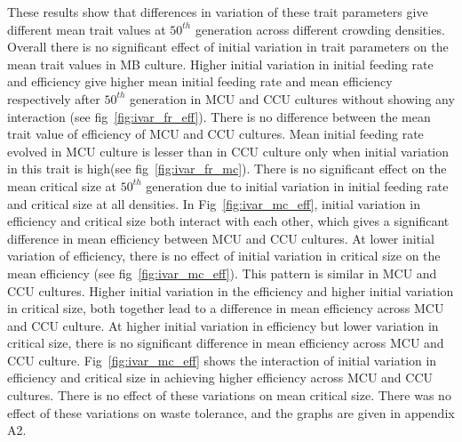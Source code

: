 These results show that differences in variation of these trait parameters give different mean trait values at $50^{th}$ generation across different crowding densities. Overall there is no significant effect of initial variation in trait parameters on the mean trait values in MB culture. Higher initial variation in initial feeding rate and efficiency give higher mean initial feeding rate and mean efficiency respectively after $50^{th}$ generation in MCU and CCU cultures without showing any interaction (see fig~\ref{fig:ivar_fr_eff}). There is no difference between the mean trait value of efficiency of MCU and CCU cultures. Mean initial feeding rate evolved in MCU culture is lesser than in CCU culture only when initial variation in this trait is high(see fig~\ref{fig:ivar_fr_mc}). There is no significant effect on the mean critical size at $50^{th}$ generation due to initial variation in initial feeding rate and critical size at all densities. In Fig~\ref{fig:ivar_mc_eff}, initial variation in efficiency and critical size both interact with each other, which gives a significant difference in mean efficiency between MCU and CCU cultures. At lower initial variation of efficiency, there is no effect of initial variation in critical size on the mean efficiency (see fig~\ref{fig:ivar_mc_eff}). This pattern is similar in MCU and CCU cultures. Higher initial variation in the efficiency and higher initial variation in critical size, both together lead to a difference in mean efficiency across MCU and CCU culture. At higher initial variation in efficiency but lower variation in critical size, there is no significant difference in mean efficiency across MCU and CCU culture. Fig~\ref{fig:ivar_mc_eff} shows the interaction of initial variation in efficiency and critical size in achieving higher efficiency across MCU and CCU cultures. There is no effect of these variations on mean critical size. There was no effect of these variations on waste tolerance, and the graphs are given in appendix A2.
